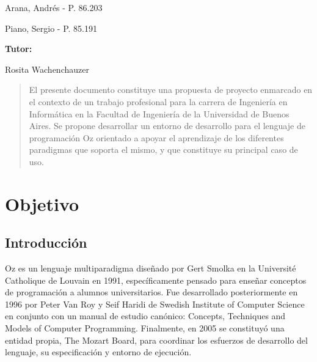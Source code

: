 \documentclass[a4paper,11pt]{article}
\begin{document}
\begin{titlepage}
\begin{bottompar}
\begin{minipage}[t]{.45\linewidth}
\begin{flushleft}
        Arana, Andrés          - P. 86.203

        Piano, Sergio          - P. 85.191
      \end{flushleft}
    \end{minipage}
    \hfill
    \begin{minipage}[t]{.45\linewidth}
      \begin{flushright}
        {\bfseries Tutor:}

        Rosita Wachenchauzer
      \end{flushright}
    \end{minipage}
  \end{bottompar}

\end{titlepage}

\begin{abstract}

  El presente documento constituye una propuesta de proyecto enmarcado en el
  contexto de un trabajo profesional para la carrera de Ingeniería en
  Informática en la Facultad de Ingeniería de la Universidad de Buenos Aires.
  Se propone desarrollar un entorno de desarrollo para el lenguaje de
  programación Oz orientado a apoyar el aprendizaje de los diferentes
  paradigmas que soporta el mismo, y que constituye su principal caso de uso.

\end{abstract}
\clearpage

\tableofcontents
\clearpage

\section{Objetivo}

\subsection{Introducción}

Oz es un lenguaje multiparadigma diseñado por Gert Smolka en la Université
Catholique de Louvain en 1991, específicamente pensado para enseñar conceptos
de programación a alumnos universitarios. Fue desarrollado posteriormente en
1996 por Peter Van Roy y Seif Haridi de Swedish Institute of Computer Science
en conjunto con un manual de estudio canónico: Concepts, Techniques and Models
of Computer Programming. Finalmente, en 2005 se constituyó una entidad propia,
The Mozart Board, para coordinar los esfuerzos de desarrollo del lenguaje, su
especificación y entorno de ejecución.
\end{document}
